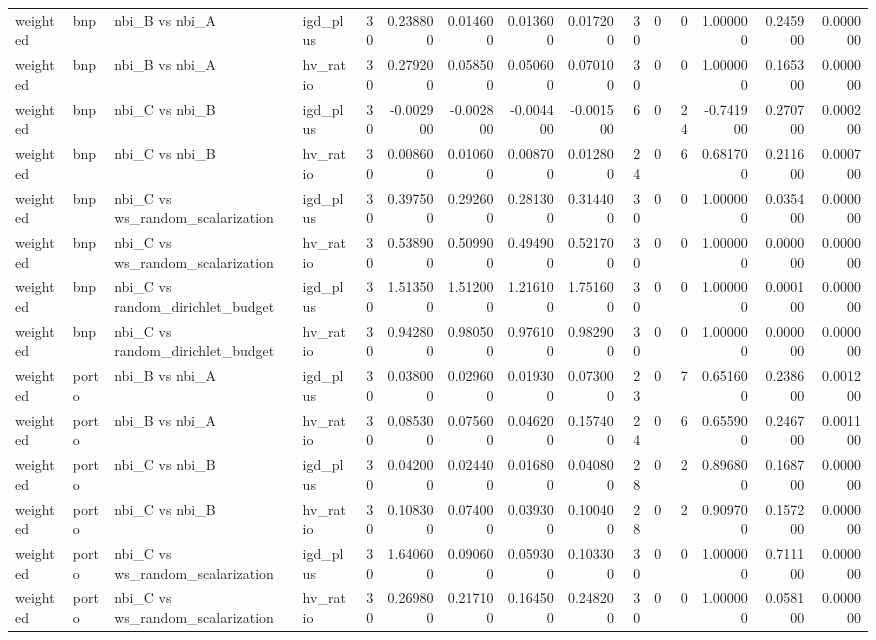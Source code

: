 \begin{landscape}
\begin{longtable}{llllrrrrrrrrrrr}
weighted & bnp & nbi\_B vs nbi\_A & igd\_plus & 30 & 0.238800 & 0.014600 & 0.013600 & 0.017200 & 30 & 0 & 0 & 1.000000 & 0.245900 & 0.000000 \\
weighted & bnp & nbi\_B vs nbi\_A & hv\_ratio & 30 & 0.279200 & 0.058500 & 0.050600 & 0.070100 & 30 & 0 & 0 & 1.000000 & 0.165300 & 0.000000 \\
weighted & bnp & nbi\_C vs nbi\_B & igd\_plus & 30 & -0.002900 & -0.002800 & -0.004400 & -0.001500 & 6 & 0 & 24 & -0.741900 & 0.270700 & 0.000200 \\
weighted & bnp & nbi\_C vs nbi\_B & hv\_ratio & 30 & 0.008600 & 0.010600 & 0.008700 & 0.012800 & 24 & 0 & 6 & 0.681700 & 0.211600 & 0.000700 \\
weighted & bnp & nbi\_C vs ws\_random\_scalarization & igd\_plus & 30 & 0.397500 & 0.292600 & 0.281300 & 0.314400 & 30 & 0 & 0 & 1.000000 & 0.035400 & 0.000000 \\
weighted & bnp & nbi\_C vs ws\_random\_scalarization & hv\_ratio & 30 & 0.538900 & 0.509900 & 0.494900 & 0.521700 & 30 & 0 & 0 & 1.000000 & 0.000000 & 0.000000 \\
weighted & bnp & nbi\_C vs random\_dirichlet\_budget & igd\_plus & 30 & 1.513500 & 1.512000 & 1.216100 & 1.751600 & 30 & 0 & 0 & 1.000000 & 0.000100 & 0.000000 \\
weighted & bnp & nbi\_C vs random\_dirichlet\_budget & hv\_ratio & 30 & 0.942800 & 0.980500 & 0.976100 & 0.982900 & 30 & 0 & 0 & 1.000000 & 0.000000 & 0.000000 \\
weighted & porto & nbi\_B vs nbi\_A & igd\_plus & 30 & 0.038000 & 0.029600 & 0.019300 & 0.073000 & 23 & 0 & 7 & 0.651600 & 0.238600 & 0.001200 \\
weighted & porto & nbi\_B vs nbi\_A & hv\_ratio & 30 & 0.085300 & 0.075600 & 0.046200 & 0.157400 & 24 & 0 & 6 & 0.655900 & 0.246700 & 0.001100 \\
weighted & porto & nbi\_C vs nbi\_B & igd\_plus & 30 & 0.042000 & 0.024400 & 0.016800 & 0.040800 & 28 & 0 & 2 & 0.896800 & 0.168700 & 0.000000 \\
weighted & porto & nbi\_C vs nbi\_B & hv\_ratio & 30 & 0.108300 & 0.074000 & 0.039300 & 0.100400 & 28 & 0 & 2 & 0.909700 & 0.157200 & 0.000000 \\
weighted & porto & nbi\_C vs ws\_random\_scalarization & igd\_plus & 30 & 1.640600 & 0.090600 & 0.059300 & 0.103300 & 30 & 0 & 0 & 1.000000 & 0.711100 & 0.000000 \\
weighted & porto & nbi\_C vs ws\_random\_scalarization & hv\_ratio & 30 & 0.269800 & 0.217100 & 0.164500 & 0.248200 & 30 & 0 & 0 & 1.000000 & 0.058100 & 0.000000 \\

\end{longtable}
\end{landscape}
